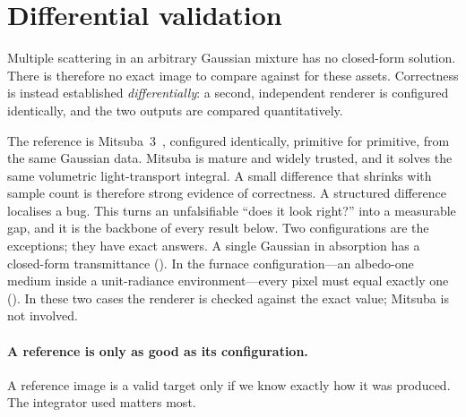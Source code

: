 \section{Differential validation}
\label{sec:reference-problem}

Multiple scattering in an arbitrary Gaussian mixture has no closed-form solution. There is
therefore no exact image to compare against for these assets. Correctness is instead
established \emph{differentially}: a second, independent renderer is configured identically,
and the two outputs are compared quantitatively.

The reference is Mitsuba~3~\cite{Mitsuba3}, configured identically, primitive for primitive,
from the same Gaussian data. Mitsuba is mature and widely trusted, and it solves the same
volumetric light-transport integral. A small difference that shrinks with sample count is
therefore strong evidence of correctness. A structured difference localises a bug. This turns
an unfalsifiable ``does it look right?'' into a measurable gap, and it is the backbone of
every result below. Two configurations are the exceptions; they have exact answers. A single Gaussian in
absorption has a closed-form transmittance (). In the furnace
configuration---an albedo-one medium inside a unit-radiance environment---every pixel must
equal exactly one (). In these two cases the renderer is checked
against the exact value; Mitsuba is not involved.

\paragraph{A reference is only as good as its configuration.} A reference image is a valid
target only if we know exactly how it was produced. The integrator used matters most.

